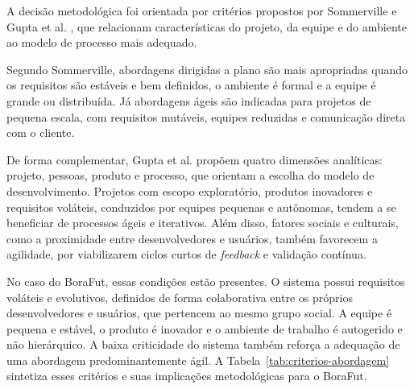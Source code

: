         A decisão metodológica foi orientada por critérios propostos por Sommerville \cite{sommerville2011} e Gupta et al. \cite{gupta2019}, que relacionam características do projeto, da equipe e do ambiente ao modelo de processo mais adequado. 

        Segundo Sommerville, abordagens dirigidas a plano são mais apropriadas quando os requisitos são estáveis e bem definidos, o ambiente é formal e a equipe é grande ou distribuída. Já abordagens ágeis são indicadas para projetos de pequena escala, com requisitos mutáveis, equipes reduzidas e comunicação direta com o cliente.

        De forma complementar, Gupta et al. propõem quatro dimensões analíticas: projeto, pessoas, produto e processo, que orientam a escolha do modelo de desenvolvimento. Projetos com escopo exploratório, produtos inovadores e requisitos voláteis, conduzidos por equipes pequenas e autônomas, tendem a se beneficiar de processos ágeis e iterativos. Além disso, fatores sociais e culturais, como a proximidade entre desenvolvedores e usuários, também favorecem a agilidade, por viabilizarem ciclos curtos de \textit{feedback} e validação contínua.

        No caso do BoraFut, essas condições estão presentes. O sistema possui requisitos voláteis e evolutivos, definidos de forma colaborativa entre os próprios desenvolvedores e usuários, que pertencem ao mesmo grupo social. A equipe é pequena e estável, o produto é inovador e o ambiente de trabalho é autogerido e não hierárquico. A baixa criticidade do sistema também reforça a adequação de uma abordagem predominantemente ágil. A Tabela~\ref{tab:criterios-abordagem} sintetiza esses critérios e suas implicações metodológicas para o BoraFut.

